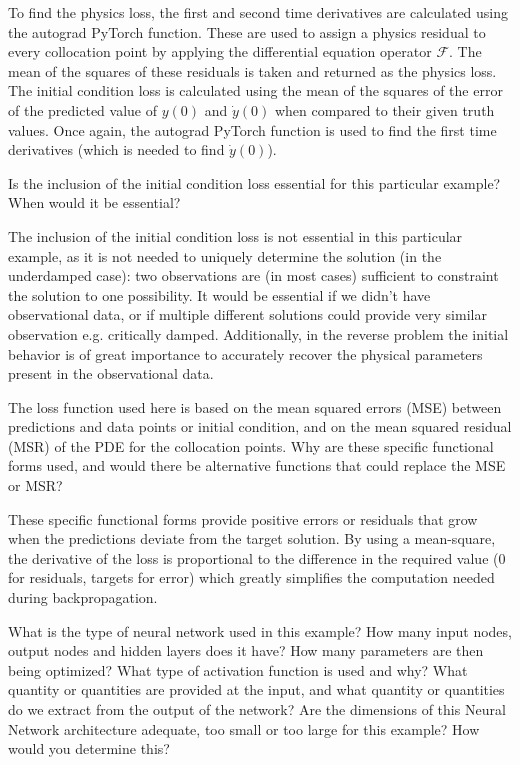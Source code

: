 \documentclass[12pt, a4paper]{report}
\begin{document}
To find the physics loss, the first and second time derivatives are calculated using the autograd PyTorch function. These are used to assign a physics residual to every collocation point by applying the differential equation operator $\mathcal{F}$. The mean of the squares of these residuals is taken and returned as the physics loss.\\
The initial condition loss is calculated using the mean of the squares of the error of the predicted value of $y(0)$ and $\dot{y}(0)$ when compared to their given truth values. Once again, the autograd PyTorch function is used to find the first time derivatives (which is needed to find $\dot{y}(0)$).\\
\begin{tcolorbox}[title=Methods Question 2,sharp corners, colframe=black, colback=white]
    Is the inclusion of the initial condition loss essential for this particular example? When would it be essential?
\end{tcolorbox}
The inclusion of the initial condition loss is not essential in this particular example, as it is not needed to uniquely determine the solution (in the underdamped case): two observations are (in most cases) sufficient to constraint the solution to one possibility. It would be essential if we didn't have observational data, or if multiple different solutions could provide very similar observation e.g. critically damped. Additionally, in the reverse problem the initial behavior is of great importance to accurately recover the physical parameters present in the observational data.\\
\begin{tcolorbox}[title=Methods Question 3,sharp corners, colframe=black, colback=white]
    The loss function used here is based on the mean squared errors (MSE) between predictions and data points or initial condition, and on the mean squared residual (MSR) of the PDE for the collocation points. Why are these specific functional forms used, and would there be alternative functions that could replace the MSE or MSR?
\end{tcolorbox}
These specific functional forms provide positive errors or residuals that grow when the predictions deviate from the target solution. By using a mean-square, the derivative of the loss is proportional to the difference in the required value (0 for residuals, targets for error) which greatly simplifies the computation needed during backpropagation.\\
\begin{tcolorbox}[title=Methods Question 4,sharp corners, colframe=black, colback=white]
    What is the type of neural network used in this example? How many input nodes, output nodes and hidden layers does it have? How many parameters are then being optimized? What type of activation function is used and why? What quantity or quantities are provided at the input, and what quantity or quantities do we extract from the output of the network? Are the dimensions of this Neural Network architecture adequate, too small or too large for this example? How would you determine this?
\end{tcolorbox}
\end{document}
